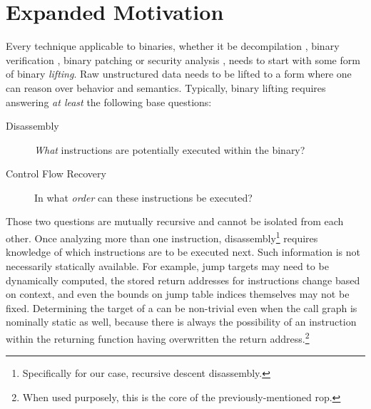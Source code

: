 \section{Expanded Motivation}
Every technique applicable to binaries, whether it be decompilation \autocite{brumley2013native,dinaburg2014mcsema}, binary verification \autocite{goelphd,brumley2011bap,tan2015auspice}, binary patching \autocite{wartell2012binary,kim2017revarm} or security analysis \autocite{kruegel2005automating,song2008bitblaze,davi2009dynamic,wang2017angr}, needs to start with some form of binary \emph{lifting}.
Raw unstructured data needs to be lifted to a form where one can reason over behavior and semantics.
Typically, binary lifting requires answering \emph{at least} the following base questions:
\begin{description}
  \item[Disassembly] \emph{What} instructions are potentially executed within the binary?
  \item[Control Flow Recovery] In what \emph{order} can these instructions be executed?
\end{description}
Those two questions are mutually recursive and cannot be isolated from each other.
Once analyzing more than one instruction, disassembly\footnote{%
  Specifically for our case, recursive descent disassembly.%
}
requires knowledge of which instructions are to be executed next.
Such information is not necessarily statically available. For example, jump targets may need to be dynamically computed, the stored return addresses for  instructions change based on context, and even the bounds on jump table indices themselves may not be fixed.
Determining the target of a  can be non-trivial even when the call graph is nominally static as well, because there is always the possibility of an instruction within the returning function having overwritten the return address.\footnote{When used purposely, this is the core of the previously-mentioned \ac{rop}.}

